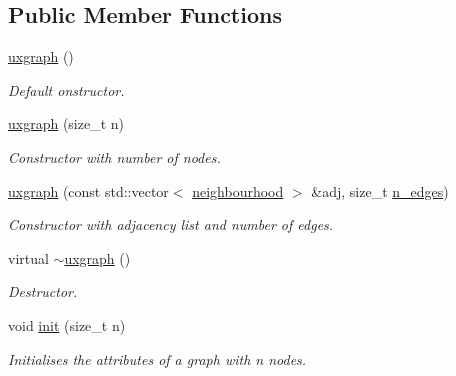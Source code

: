 \subsection*{Public Member Functions}
\begin{DoxyCompactItemize}
\item 
\mbox{\label{classlgraph_1_1uxgraph_a9a57e95d157fa8de41f3e8caef155e46}} 
\hyperlink{classlgraph_1_1uxgraph_a9a57e95d157fa8de41f3e8caef155e46}{uxgraph} ()
\begin{DoxyCompactList}\small\item\em Default onstructor. \end{DoxyCompactList}\item 
\mbox{\label{classlgraph_1_1uxgraph_a81f289cc52bad6d971390a39d3dae529}} 
\hyperlink{classlgraph_1_1uxgraph_a81f289cc52bad6d971390a39d3dae529}{uxgraph} (size\+\_\+t n)
\begin{DoxyCompactList}\small\item\em Constructor with number of nodes. \end{DoxyCompactList}\item 
\hyperlink{classlgraph_1_1uxgraph_a18a6a844ef0d8d719501216ef6c6bd76}{uxgraph} (const std\+::vector$<$ \hyperlink{namespacelgraph_a052e7766c13f3a43cec0aec8173fdede}{neighbourhood} $>$ \&adj, size\+\_\+t \hyperlink{classlgraph_1_1xxgraph_af00bce8b07a42754601d1e3bebe2c1fa}{n\+\_\+edges})
\begin{DoxyCompactList}\small\item\em Constructor with adjacency list and number of edges. \end{DoxyCompactList}\item 
\mbox{\label{classlgraph_1_1uxgraph_a8893aa833e787a7241654259f87dc767}} 
virtual \hyperlink{classlgraph_1_1uxgraph_a8893aa833e787a7241654259f87dc767}{$\sim$uxgraph} ()
\begin{DoxyCompactList}\small\item\em Destructor. \end{DoxyCompactList}\item 
void \hyperlink{classlgraph_1_1uxgraph_a539e735d68b55ce01d733262c9db34d5}{init} (size\+\_\+t n)
\begin{DoxyCompactList}\small\item\em Initialises the attributes of a graph with {\itshape n} nodes. \end{DoxyCompactList}\item 

\end{DoxyCompactItemize}
